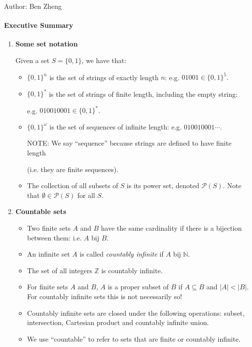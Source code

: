 \documentclass[solution, letterpaper]{cs20inclass}
\begin{document}

\noindent Author: Ben Zheng

\paragraph*{Executive Summary}
\begin{enumerate}

\item \textbf{Some set notation}

Given a set $S = \{0,1\}$, we have that:
\begin{itemize}
\item $\{0,1\}^n$ is the set of strings of exactly length $n$: e.g. $01001 \in \{0,1\}^5.$
\item $\{0,1\}^*$ is the set of strings of finite length, including the empty string: 

e.g. $010010001 \in \{0,1\}^*.$
\item $\{0,1\}^{\omega}$ is the set of sequences of infinite length: e.g. $010010001\cdots.$ 

NOTE: We say ``sequence'' because strings are defined to have finite length 

(i.e. they are finite sequences).
\item The collection of all subsets of $S$ is its power set, denoted $\mathcal{P}(S)$. Note that $\emptyset \in \mathcal{P}(S)$ for all $S$.
\end{itemize}

\item \textbf{Countable sets}
\begin{itemize}
\item Two finite sets $A$ and $B$ have the same cardinality if there is a bijection between them: i.e. $A$ bij $B$.
\item An infinite set $A$ is called \emph{countably infinite} if $A$ bij $\mathbb{N}$.
\item The set of all integers $\mathbb{Z}$ is countably infinite.
\item For finite sets $A$ and $B$, $A$ is a proper subset of $B$ if $A \subseteq B$ and $|A| < |B|.$ For countably infinite sets this is not necessarily so!
\item Countably infinite sets are closed under the following operations: subset, intersection, Cartesian product and countably infinite union.
\item We use ``countable'' to refer to sets that are finite or countably infinite.
\end{itemize}


\end{enumerate}
\end{document}
